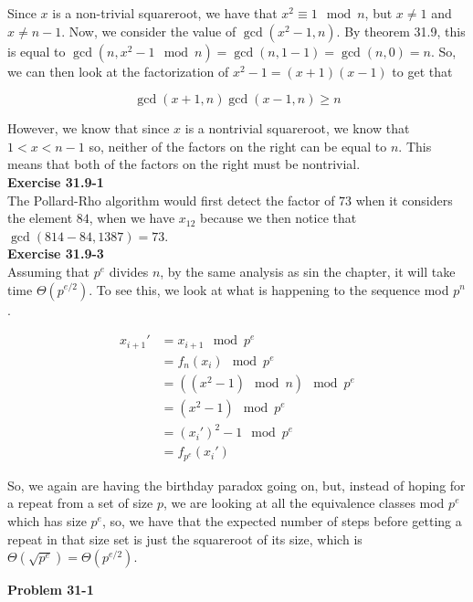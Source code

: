 \documentclass{article}
\begin{document}
Since $x$ is a non-trivial squareroot, we have that $x^2 \equiv 1 \mod n$, but $x\neq 1$ and $x\neq n-1$. Now, we consider the value of $\gcd(x^2-1,n)$. By theorem 31.9, this is equal to $\gcd(n, x^2-1\mod n) = \gcd(n,1-1) = \gcd(n,0) = n$. So, we can then look at the factorization of $x^2-1 = (x+1)(x-1)$ to get that

\[
\gcd(x+1,n)\gcd(x-1,n) \ge n
\]

However, we know that since $x$ is a nontrivial squareroot, we know that $1 < x < n-1$ so, neither of the factors on the right can be equal to $n$. This means that both of the factors on the right must be nontrivial.\\



\noindent\textbf{Exercise 31.9-1}\\

The Pollard-Rho algorithm would first detect the factor of $73$ when it considers the element $84$, when we have $x_{12}$ because we then notice that $\gcd(814-84,1387) = 73$.\\



\noindent\textbf{Exercise 31.9-3}\\

Assuming that $p^e$ divides $n$, by the same analysis as sin the chapter, it will take time $\Theta(p^{e/2})$. To see this, we look at what is happening to the sequence mod $p^n$.

\begin{align*}
x_{i+1}' &= x_{i+1} \mod p^e\\
& = f_n(x_i) \mod p^e\\
&=((x^2-1)\mod n)\mod p^e\\
&=(x^2-1)\mod p^e\\
&= (x_i')^2-1 \mod p^e\\
&=f_{p^e}(x_i')
\end{align*}

So, we again are having the birthday paradox going on, but, instead of hoping for a repeat from a set of size $p$, we are looking at all the equivalence classes mod $p^e$ which has size $p^e$, so, we have that the expected number of steps before getting a repeat in that size set is just the squareroot of its size, which is $\Theta(\sqrt{p^{e}}) =\Theta(p^{e/2})$. 


\noindent\textbf{Problem 31-1}\\
\end{document}
